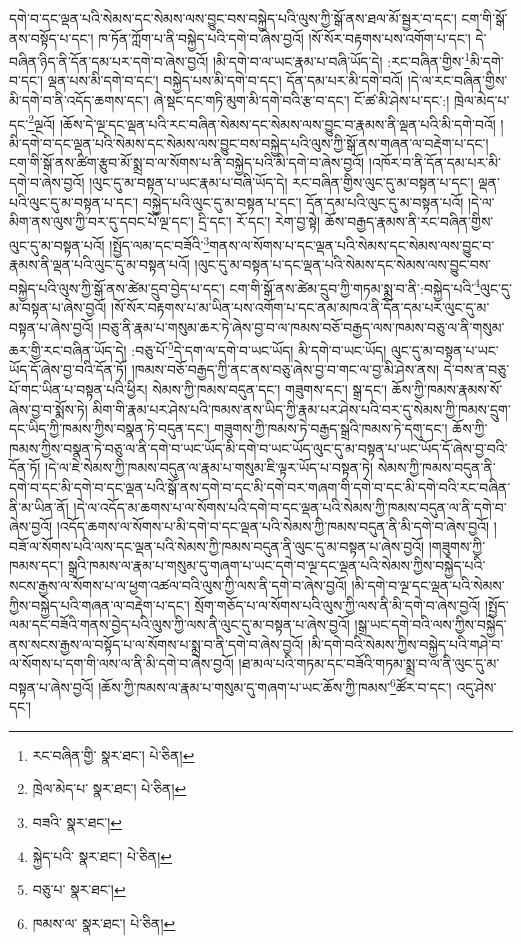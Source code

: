 དགེ་བ་དང་ལྡན་པའི་སེམས་དང་སེམས་ལས་བྱུང་བས་བསྐྱེད་པའི་ལུས་ཀྱི་སྒོ་ནས་ཐལ་མོ་སྦྱར་བ་དང་། ངག་གི་སྒོ་ནས་བསྟོད་པ་དང་། ཁ་ཏོན་ཀློག་པ་ནི་བསྐྱེད་པའི་དགེ་བ་ཞེས་བྱའོ། །སོ་སོར་བརྟགས་པས་འགོག་པ་དང་། དེ་བཞིན་ཉིད་ནི་དོན་དམ་པར་དགེ་བ་ཞེས་བྱའོ། །མི་དགེ་བ་ལ་ཡང་རྣམ་པ་བཞི་ཡོད་དེ། :རང་བཞིན་གྱིས་\footnote{རང་བཞིན་གྱི་  སྣར་ཐང་།  པེ་ཅིན། }མི་དགེ་བ་དང་། ལྡན་པས་མི་དགེ་བ་དང་། བསྐྱེད་པས་མི་དགེ་བ་དང་། དོན་དམ་པར་མི་དགེ་བའོ། །དེ་ལ་རང་བཞིན་གྱིས་མི་དགེ་བ་ནི་འདོད་ཆགས་དང་། ཞེ་སྡང་དང་གཏི་མུག་མི་དགེ་བའི་རྩ་བ་དང་། ངོ་ཚ་མི་ཤེས་པ་དང་:། ཁྲེལ་མེད་པ་དང་\footnote{ཁྲེལ་མེད་པ་  སྣར་ཐང་།  པེ་ཅིན། }ལྔའོ། །ཆོས་དེ་ལྔ་དང་ལྡན་པའི་རང་བཞིན་སེམས་དང་སེམས་ལས་བྱུང་བ་རྣམས་ནི་ལྡན་པའི་མི་དགེ་བའོ། །མི་དགེ་བ་དང་ལྡན་པའི་སེམས་དང་སེམས་ལས་བྱུང་བས་བསྐྱེད་པའི་ལུས་ཀྱི་སྒོ་ནས་གཞན་ལ་བརྡེག་པ་དང་། ངག་གི་སྒོ་ནས་ཚིག་རྩུབ་མོ་སྨྲ་བ་ལ་སོགས་པ་ནི་བསྐྱེད་པའི་མི་དགེ་བ་ཞེས་བྱའོ། །འཁོར་བ་ནི་དོན་དམ་པར་མི་དགེ་བ་ཞེས་བྱའོ། །ལུང་དུ་མ་བསྟན་པ་ཡང་རྣམ་པ་བཞི་ཡོད་དེ། རང་བཞིན་གྱིས་ལུང་དུ་མ་བསྟན་པ་དང་། ལྡན་པའི་ལུང་དུ་མ་བསྟན་པ་དང་། བསྐྱེད་པའི་ལུང་དུ་མ་བསྟན་པ་དང་། དོན་དམ་པའི་ལུང་དུ་མ་བསྟན་པའོ། །དེ་ལ་མིག་ནས་ལུས་ཀྱི་བར་དུ་དབང་པོ་ལྔ་དང་། དྲི་དང་། རོ་དང་། རེག་བྱ་སྟེ། ཆོས་བརྒྱད་རྣམས་ནི་རང་བཞིན་གྱིས་ལུང་དུ་མ་བསྟན་པའོ། །སྤྱོད་ལམ་དང་བཟོའི་\footnote{བཟའི་  སྣར་ཐང་། }གནས་ལ་སོགས་པ་དང་ལྡན་པའི་སེམས་དང་སེམས་ལས་བྱུང་བ་རྣམས་ནི་ལྡན་པའི་ལུང་དུ་མ་བསྟན་པའོ། །ལུང་དུ་མ་བསྟན་པ་དང་ལྡན་པའི་སེམས་དང་སེམས་ལས་བྱུང་བས་བསྐྱེད་པའི་ལུས་ཀྱི་སྒོ་ནས་ཚེམ་དྲུབ་བྱེད་པ་དང་། ངག་གི་སྒོ་ནས་ཚེམ་དྲུབ་ཀྱི་གཏམ་སྨྲ་བ་ནི་:བསྐྱེད་པའི་\footnote{སྐྱེད་པའི་  སྣར་ཐང་།  པེ་ཅིན། }ལུང་དུ་མ་བསྟན་པ་ཞེས་བྱའོ། །སོ་སོར་བརྟགས་པ་མ་ཡིན་པས་འགོག་པ་དང་ནམ་མཁའ་ནི་དོན་དམ་པར་ལུང་དུ་མ་བསྟན་པ་ཞེས་བྱའོ། །བཅུ་ནི་རྣམ་པ་གསུམ་ཆར་ཏེ་ཞེས་བྱ་བ་ལ་ཁམས་བཅོ་བརྒྱད་ལས་ཁམས་བཅུ་ལ་ནི་གསུམ་ཆར་གྱི་རང་བཞིན་ཡོད་དེ། :བཅུ་པོ་\footnote{བཅུ་པ་  སྣར་ཐང་། }དེ་དག་ལ་དགེ་བ་ཡང་ཡོད། མི་དགེ་བ་ཡང་ཡོད། ལུང་དུ་མ་བསྟན་པ་ཡང་ཡོད་དོ་ཞེས་བྱ་བའི་དོན་ཏོ། །ཁམས་བཅོ་བརྒྱད་ཀྱི་ནང་ནས་བཅུ་ཞེས་བྱ་བ་གང་ལ་བྱ་མི་ཤེས་ནས། དེ་བས་ན་བཅུ་པོ་གང་ཡིན་པ་བསྟན་པའི་ཕྱིར། སེམས་ཀྱི་ཁམས་བདུན་དང་། གཟུགས་དང་། སྒྲ་དང་། ཆོས་ཀྱི་ཁམས་རྣམས་སོ་ཞེས་བྱ་བ་སྨོས་ཏེ། མིག་གི་རྣམ་པར་ཤེས་པའི་ཁམས་ནས་ཡིད་ཀྱི་རྣམ་པར་ཤེས་པའི་བར་དུ་སེམས་ཀྱི་ཁམས་དྲུག་དང་ཡིད་ཀྱི་ཁམས་ཀྱིས་བསྣན་ཏེ་བདུན་དང་། གཟུགས་ཀྱི་ཁམས་ཏེ་བརྒྱད་སྒྲའི་ཁམས་ཏེ་དགུ་དང་། ཆོས་ཀྱི་ཁམས་ཀྱིས་བསྣན་ཏེ་བཅུ་ལ་ནི་དགེ་བ་ཡང་ཡོད་མི་དགེ་བ་ཡང་ཡོད་ལུང་དུ་མ་བསྟན་པ་ཡང་ཡོད་དོ་ཞེས་བྱ་བའི་དོན་ཏོ། །དེ་ལ་ཇེ་སེམས་ཀྱི་ཁམས་བདུན་ལ་རྣམ་པ་གསུམ་ཇི་ལྟར་ཡོད་པ་བསྟན་ཏེ། སེམས་ཀྱི་ཁམས་བདུན་ནི་དགེ་བ་དང་མི་དགེ་བ་དང་ལྡན་པའི་སྒོ་ནས་དགེ་བ་དང་མི་དགེ་བར་གཞག་གི་དགེ་བ་དང་མི་དགེ་བའི་རང་བཞིན་ནི་མ་ཡིན་ནོ། །དེ་ལ་འདོད་མ་ཆགས་པ་ལ་སོགས་པའི་དགེ་བ་དང་ལྡན་པའི་སེམས་ཀྱི་ཁམས་བདུན་ལ་ནི་དགེ་བ་ཞེས་བྱའོ། །འདོད་ཆགས་ལ་སོགས་པ་མི་དགེ་བ་དང་ལྡན་པའི་སེམས་ཀྱི་ཁམས་བདུན་ནི་མི་དགེ་བ་ཞེས་བྱའོ། །བཟོ་ལ་སོགས་པའི་ལས་དང་ལྡན་པའི་སེམས་ཀྱི་ཁམས་བདུན་ནི་ལུང་དུ་མ་བསྟན་པ་ཞེས་བྱའོ། །གཟུགས་ཀྱི་ཁམས་དང་། སྒྲའི་ཁམས་ལ་རྣམ་པ་གསུམ་དུ་གཞག་པ་ཡང་དགེ་བ་ལྔ་དང་ལྡན་པའི་སེམས་ཀྱིས་བསྐྱེད་པའི་སངས་རྒྱས་ལ་སོགས་པ་ལ་ཕྱག་འཚལ་བའི་ལུས་ཀྱི་ལས་ནི་དགེ་བ་ཞེས་བྱའོ། །མི་དགེ་བ་ལྔ་དང་ལྡན་པའི་སེམས་ཀྱིས་བསྐྱེད་པའི་གཞན་ལ་བརྡེག་པ་དང་། སྲོག་གཅོད་པ་ལ་སོགས་པའི་ལུས་ཀྱི་ལས་ནི་མི་དགེ་བ་ཞེས་བྱའོ། །སྤྱོད་ལམ་དང་བཟོའི་གནས་བྱེད་པའི་ལུས་ཀྱི་ལས་ནི་ལུང་དུ་མ་བསྟན་པ་ཞེས་བྱའོ། །སྒྲ་ཡང་དགེ་བའི་ལས་ཀྱིས་བསྐྱེད་ནས་སངས་རྒྱས་ལ་བསྟོད་པ་ལ་སོགས་པ་སྨྲ་བ་ནི་དགེ་བ་ཞེས་བྱའོ། །མི་དགེ་བའི་སེམས་ཀྱིས་བསྐྱེད་པའི་གཤེ་བ་ལ་སོགས་པ་དག་གི་ལས་ལ་ནི་མི་དགེ་བ་ཞེས་བྱའོ། །ཐ་མལ་པའི་གཏམ་དང་བཟོའི་གཏམ་སྨྲ་བ་ལ་ནི་ལུང་དུ་མ་བསྟན་པ་ཞེས་བྱའོ། །ཆོས་ཀྱི་ཁམས་ལ་རྣམ་པ་གསུམ་དུ་གཞག་པ་ཡང་ཆོས་ཀྱི་ཁམས་\footnote{ཁམས་ལ་  སྣར་ཐང་།  པེ་ཅིན། }ཚོར་བ་དང་། འདུ་ཤེས་དང་། 